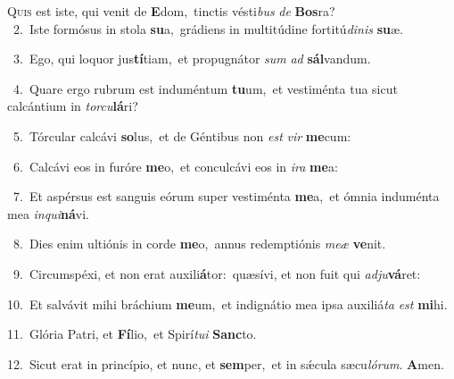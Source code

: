 \lettrine{\initial\textcolor{\initialcolor}{Q}}{uis} est iste, qui venit de \textbf{E}\-dom,~\star tinctis vésti\textit{bus} \textit{de} \textbf{Bos}\-ra?\\
{\numbfont\textcolor{\numbcolor}{~2.}}~Iste formósus in stola \textbf{su}\-a,~\star grádiens in multitúdine fortitú\-\textit{di}\-\textit{nis} \textbf{su}\-æ.\par
{\numbfont\textcolor{\numbcolor}{~3.}}~Ego, qui loquor jus\-\textbf{tí}\-tiam,~\star et propugnátor \textit{sum} \textit{ad} \textbf{sál}\-vandum.\par
{\numbfont\textcolor{\numbcolor}{~4.}}~Quare ergo rubrum est induméntum \textbf{tu}\-um,~\star et vestiménta tua sicut calcántium in \textit{tor}\-\textit{cu}\textbf{lá}ri?\par
{\numbfont\textcolor{\numbcolor}{~5.}}~Tórcular calcávi \textbf{so}\-lus,~\star et de Géntibus non \textit{est} \textit{vir} \textbf{me}\-cum:\par
{\numbfont\textcolor{\numbcolor}{~6.}}~Calcávi eos in furóre \textbf{me}\-o,~\star et conculcávi eos in \textit{i}\-\textit{ra} \textbf{me}\-a:\par
{\numbfont\textcolor{\numbcolor}{~7.}}~Et aspérsus est sanguis eórum super vestiménta \textbf{me}\-a,~\star et ómnia induménta mea \textit{in}\-\textit{qui}\textbf{ná}vi.\par
{\numbfont\textcolor{\numbcolor}{~8.}}~Dies enim ultiónis in corde \textbf{me}\-o,~\star annus redemptiónis \textit{me}\-\textit{æ} \textbf{ve}\-nit.\par
{\numbfont\textcolor{\numbcolor}{~9.}}~Circumspéxi, et non erat auxili\-\textbf{á}\-tor:~\star quæsívi, et non fuit qui \textit{ad}\-\textit{ju}\textbf{vá}ret:\par
{\numbfont\textcolor{\numbcolor}{10.}}~Et salvávit mihi bráchium \textbf{me}\-um,~\star et indignátio mea ipsa auxiliá\textit{ta} \textit{est} \textbf{mi}\-hi.\par
{\numbfont\textcolor{\numbcolor}{11.}}~Glória Patri, et \textbf{Fí}\-lio,~\star et Spirí\-\textit{tu}\-\textit{i} \textbf{Sanc}\-to.\par
{\numbfont\textcolor{\numbcolor}{12.}}~Sicut erat in princípio, et nunc, et \textbf{sem}\-per,~\star et in sǽcula sæcu\-\textit{ló}\-\textit{rum}. \textbf{A}\-men.\par
